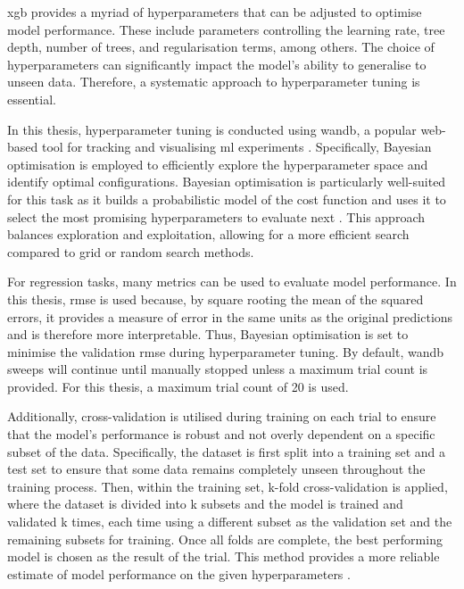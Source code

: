 \acrshort{xgb} provides a myriad of hyperparameters that can be adjusted to optimise model performance. These include parameters controlling the learning rate, tree depth, number of trees, and regularisation terms, among others. The choice of hyperparameters can significantly impact the model's ability to generalise to unseen data. Therefore, a systematic approach to hyperparameter tuning is essential. 

In this thesis, hyperparameter tuning is conducted using \acrfull{wandb}, a popular web-based tool for tracking and visualising \acrshort{ml} experiments \citep{Biewald2020}. Specifically, Bayesian optimisation is employed to efficiently explore the hyperparameter space and identify optimal configurations. Bayesian optimisation is particularly well-suited for this task as it builds a probabilistic model of the cost function and uses it to select the most promising hyperparameters to evaluate next \citep{Mockus1994,Shahriari2016}. This approach balances exploration and exploitation, allowing for a more efficient search compared to grid or random search methods. 

For regression tasks, many metrics can be used to evaluate model performance. In this thesis, \acrfull{rmse} is used because, by square rooting the mean of the squared errors, it provides a measure of error in the same units as the original predictions and is therefore more interpretable. Thus, Bayesian optimisation is set to minimise the validation \acrshort{rmse} during hyperparameter tuning. By default, \acrshort{wandb} sweeps will continue until manually stopped unless a maximum trial count is provided. For this thesis, a maximum trial count of 20 is used. 

Additionally, cross-validation is utilised during training on each trial to ensure that the model's performance is robust and not overly dependent on a specific subset of the data. Specifically, the dataset is first split into a training set and a test set to ensure that some data remains completely unseen throughout the training process. Then, within the training set, k-fold cross-validation is applied, where the dataset is divided into k subsets and the model is trained and validated k times, each time using a different subset as the validation set and the remaining subsets for training. Once all folds are complete, the best performing model is chosen as the result of the trial. This method provides a more reliable estimate of model performance on the given hyperparameters \citep{Lopez2023,Singh2021}.

